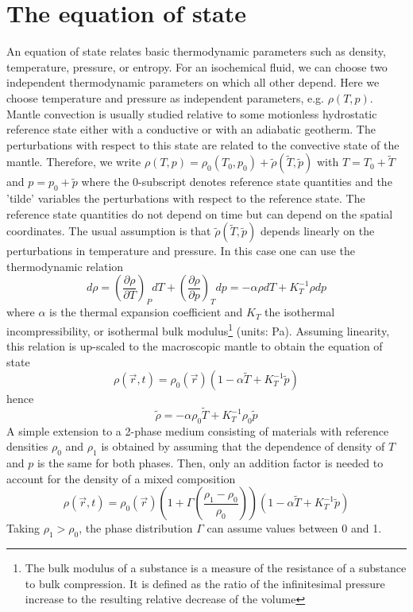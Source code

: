\newpage
\section{The equation of state}

An equation of state relates basic thermodynamic parameters such as density,
temperature, pressure, or entropy. For an isochemical fluid, we can choose two
independent thermodynamic parameters on which all other depend. Here we choose
temperature and pressure as independent parameters, e.g. $\rho(T,p)$. 
Mantle convection is
usually studied relative to some motionless hydrostatic reference state either with a
conductive or with an adiabatic geotherm. The perturbations with respect to this state are
related to the convective state of the mantle. 
Therefore, we write $\rho(T,p) = \rho_0(T_0,p_0) + \tilde{\rho}(\tilde{T},\tilde{p})$
with 
$T = T_0 + \tilde{T}$ and 
$p = p_0 + \tilde{p}$ 
where the 0-subscript denotes reference
state quantities and the 'tilde' variables 
the perturbations with respect to the reference state.
The reference state quantities do not depend on time but can depend on the spatial
coordinates. The usual assumption is that $\tilde{\rho}(\tilde{T},\tilde{p})$ 
depends linearly on the perturbations in temperature and pressure. 
In this case one can use the thermodynamic relation
\[
d\rho = 
\left( \frac{\partial \rho}{\partial T} \right)_P dT + 
\left( \frac{\partial \rho}{\partial p} \right)_T dp 
= -\alpha \rho dT + K_T^{-1} \rho dp
\]
where $\alpha$ is the thermal expansion coefficient and 
$K_T$ the isothermal incompressibility, or isothermal bulk
modulus\footnote{The bulk modulus of a substance is a measure of the resistance of a substance to bulk 
compression. It is defined as the ratio of the infinitesimal pressure increase to the resulting relative 
decrease of the volume} (units: \si{\pascal}). Assuming linearity, this relation is up-scaled to the macroscopic mantle to
obtain the equation of state
\begin{equation}
\rho(\vec{r},t) = \rho_0(\vec{r}) (1-\alpha \tilde{T} + K_T^{-1} \tilde{p} )
\label{eq:md68}
\end{equation}
hence
\[
\tilde{\rho} = -\alpha \rho_0 \tilde{T}  +  K_T^{-1} \rho_0 \tilde{p}  
\]
A simple extension to a 2-phase medium consisting of materials with reference
densities $\rho_0$ and $\rho_1$ is obtained by assuming that the dependence of density of $T$ and $p$ 
is the same for both phases. Then, only an addition factor is needed to account for the
density of a mixed composition
\begin{equation}
\rho(\vec{r},t) = \rho_0(\vec{r})\left(1+\Gamma(\frac{\rho_1-\rho_0}{\rho_0}) \right) 
(1-\alpha \tilde{T} + K_T^{-1} \tilde{p} )
\label{eq:md69}
\end{equation}
Taking $\rho_1>\rho_0$, the phase distribution $\Gamma$ can assume values between 0 and 1.

